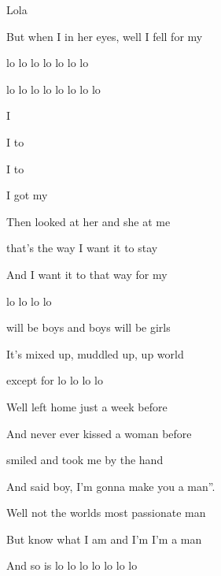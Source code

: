 \begin{SBSong}{Lola}
\begin{SBVerse}
    But when I  in her eyes, well I  fell for my 
                      
    lo lo lo lo   lo lo lo 
    
     lo lo lo lo  lo lo lo lo 
  \end{SBVerse}
  \CBPageBrk
  \begin{SBVerse}
    I   
                
    I  to  
       
    I  to  
         
    I got   my 
        
    Then  looked at her and she at me
  \end{SBVerse}
  
  \begin{SBVerse}     
     that's the way I want it to stay
              
    And I  want it to  that way for my 

     lo lo lo lo 
  \end{SBVerse}
  \begin{SBVerse}
     will be boys and boys will be girls
                                                                                     
    It's  mixed up, muddled up,  up world 

    except for  lo lo lo lo 
  \end{SBVerse}
  \begin{SBVerse}         
    Well  left home just a week before
             
    And  never ever kissed a woman before
     
     smiled and took me by the hand 
    
    And said  boy, I'm gonna make you a man''.
  \end{SBVerse}
  \begin{SBVerse}          
    Well  not the worlds most passionate man
                                                   
    But  know what I am and I'm  I'm a man
                                         
    And so is  lo lo lo lo   lo lo lo   
    \end{SBVerse}
\end{SBSong}

